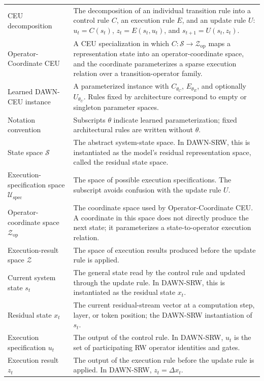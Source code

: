 \documentclass{article}
\begin{document}
\begin{minipage}{\textwidth}
\begin{center}
\begin{tabularx}{\textwidth}{lX}
CEU decomposition & The decomposition of an individual transition rule into a control rule \(C\), an execution rule \(E\), and an update rule \(U\): \(u_t=C(s_t)\), \(z_t=E(s_t,u_t)\), and \(s_{t+1}=U(s_t,z_t)\). \\
Operator-Coordinate CEU & A CEU specialization in which \(C:\mathcal{S}\to\mathcal{Z}_{\mathrm{op}}\) maps a representation state into an operator-coordinate space, and the coordinate parameterizes a sparse execution relation over a transition-operator family. \\
Learned DAWN-CEU instance & A parameterized instance with \(C_{\theta_C}\), \(E_{\theta_E}\), and optionally \(U_{\theta_U}\). Rules fixed by architecture correspond to empty or singleton parameter spaces. \\
Notation convention & Subscripts \(\theta\) indicate learned parameterization; fixed architectural rules are written without \(\theta\). \\
State space \(\mathcal{S}\) & The abstract system-state space. In DAWN-SRW, this is instantiated as the model's residual representation space, called the residual state space. \\
Execution-specification space \(\mathcal{U}_{\mathrm{spec}}\) & The space of possible execution specifications. The subscript avoids confusion with the update rule \(U\). \\
Operator-coordinate space \(\mathcal{Z}_{\mathrm{op}}\) & The coordinate space used by Operator-Coordinate CEU. A coordinate in this space does not directly produce the next state; it parameterizes a state-to-operator execution relation. \\
Execution-result space \(\mathcal{Z}\) & The space of execution results produced before the update rule is applied. \\
Current system state \(s_t\) & The general state read by the control rule and updated through the update rule. In DAWN-SRW, this is instantiated as the residual state \(x_t\). \\
Residual state \(x_t\) & The current residual-stream vector at a computation step, layer, or token position; the DAWN-SRW instantiation of \(s_t\). \\
Execution specification \(u_t\) & The output of the control rule. In DAWN-SRW, \(u_t\) is the set of participating RW operator identities and gates. \\
Execution result \(z_t\) & The output of the execution rule before the update rule is applied. In DAWN-SRW, \(z_t=\Delta x_t\). \\

\end{tabularx}
\end{center}
\end{minipage}
\end{document}
